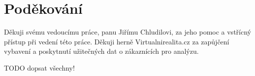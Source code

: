 \section{Poděkování}\label{podux11bkovuxe1nuxed}

Děkuji svému vedoucímu práce, panu Jiřímu Chludilovi, za jeho pomoc a
vstřícný přístup při vedení této práce. Děkuji herně Virtualnirealita.cz
za zapůjčení vybavení a poskytnutí užitečných dat o zákaznících pro
analýzu.

TODO dopsat všechny!
